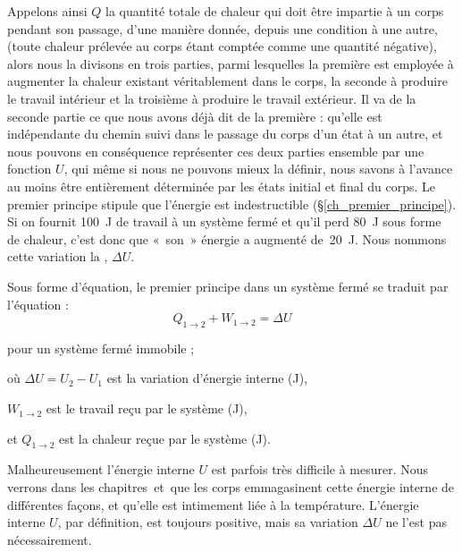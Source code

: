 		Appelons ainsi $Q$ la quantité totale de chaleur qui doit être impartie à un corps pendant son passage, d’une manière donnée, depuis une condition à une autre, (toute chaleur prélevée au corps étant comptée comme une quantité négative), alors nous la divisons en trois parties, parmi lesquelles la première est employée à augmenter la chaleur existant véritablement dans le corps, la seconde à produire le travail intérieur et la troisième à produire le travail extérieur. Il va de la seconde partie ce que nous avons déjà dit de la première : qu’elle est indépendante du chemin suivi dans le passage du corps d’un état à un autre, et nous pouvons en conséquence représenter ces deux parties ensemble par une fonction $U$, qui même si nous ne pouvons mieux la définir, nous savons à l’avance au moins être entièrement déterminée par les états initial et final du corps.
	Le premier principe stipule que l’énergie est indestructible (\S\ref{ch_premier_principe}). Si on fournit \SI{100}{\joule} de travail à un système fermé et qu’il perd \SI{80}{\joule} sous forme de chaleur, c’est donc que «~son~» énergie a augmenté de~\SI{20}{\joule}. Nous nommons cette variation la , $\Delta U$.
	
	Sous forme d’équation, le premier principe dans un système fermé se traduit par l’équation :
	\begin{equation}
		Q_{1 \to 2} + W_{1 \to 2} = \Delta U
		\label{eq_premier_principe_sf_maj}
	\end{equation}
	\onlyframabook{\begin{small}}%
	\begin{equationterms}
		\item pour un système fermé immobile ;
		\item où \tab $\Delta U = U_2 - U_1$ est la variation d’énergie interne (\si{\joule}),
		\item 	\tab $W_{1 \to 2}$ 	\tab est le travail reçu par le système (\si{\joule}),
		\item et \tab $Q_{1 \to 2}$ 	\tab est la chaleur reçue par le système (\si{\joule}).
	\end{equationterms}
	\onlyframabook{\end{small}}

	Malheureusement l’énergie interne $U$ est parfois très difficile à mesurer. Nous verrons dans les chapitres~\quatre et~\cinq que les corps emmagasinent cette énergie interne de différentes façons, et qu’elle est intimement liée à la température. L’énergie interne $U$, par définition, est toujours positive, mais sa variation $\Delta U$ ne l’est pas nécessairement.


